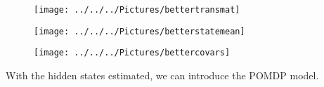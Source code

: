 \documentclass[english]{article}
\numberwithin{equation}{section}
\begin{document}
	\begin{figure}
		\centering
		\texttt{[image: ../../../Pictures/bettertransmat]}
		\caption[State transition matrix]{}
		\label{fig:transmat}
	\end{figure}
	
		\begin{figure}
		\centering
		\texttt{[image: ../../../Pictures/betterstatemean]}
		\caption[Emission matrix]{}
		\label{fig:emissionmeans}
	\end{figure}

	\begin{figure}
	\centering
	\texttt{[image: ../../../Pictures/bettercovars]}
	\caption[Emission matrix covariances]{}
	\label{fig:emissioncovars}
	\end{figure}
	
%	
%	
%	
%	
%	
%	
%	
	With the hidden states estimated, we can introduce the POMDP model.
	
\end{document}
